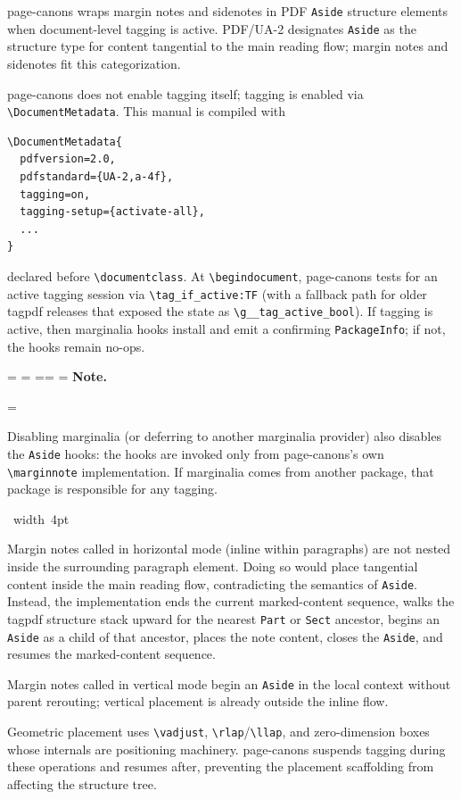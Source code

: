 \documentclass[11pt, twoside, openany]{book}
\makeatletter
\newcommand{\pkg}[1]{\textsf{#1}}
\newcommand{\cmd}[1]{\texttt{\textbackslash #1}}
\newcommand*{\cns@tag@artifact@begin}{}
\newcommand*{\cns@tag@artifact@end}{}
\newenvironment{TodoNote}[1][]{%
  \par\addvspace{0.5\baselineskip plus 2pt}%
  \setbox\cns@box=\vbox\bgroup
    \hsize=\linewidth
    \advance\hsize -10pt
    \linewidth=\hsize \columnwidth=\hsize
    \parindent=\z@
    \noindent\textbf{\sffamily Note\cns@ifnotempty{#1}{ \textmd{(#1)}}.}%
    \par\nobreak
    \@afterindentfalse\@afterheading
    \leftskip=\cns@indent\relax
    \ignorespaces
}{%
  \par
  \egroup
  \vbox{\hbox{%
    \cns@tag@artifact@begin\vrule width 4pt\cns@tag@artifact@end
    \hskip 6pt\relax
    \box\cns@box
  }}%
  \par\addvspace{0.5\baselineskip plus 2pt}%
}
\makeatother
\begin{document}
\pkg{page-canons} wraps margin notes and sidenotes in PDF \texttt{Aside} structure elements when document-level tagging is active. PDF/UA-2 designates \texttt{Aside} as the structure type for content tangential to the main reading flow; margin notes and sidenotes fit this categorization.

\pkg{page-canons} does not enable tagging itself; tagging is enabled via \cmd{DocumentMetadata}. This manual is compiled with

\begin{verbatim}
\DocumentMetadata{
  pdfversion=2.0,
  pdfstandard={UA-2,a-4f},
  tagging=on,
  tagging-setup={activate-all},
  ...
}
\end{verbatim}

declared before \cmd{documentclass}. At \cmd{begin{document}}, \pkg{page-canons} tests for an active tagging session via \cmd{tag\_if\_active:TF} (with a fallback path for older \pkg{tagpdf} releases that exposed the state as \cmd{g\_\_tag\_active\_bool}). If tagging is active, then marginalia hooks install and emit a confirming \texttt{PackageInfo}; if not, the hooks remain no-ops.

\begin{TodoNote}
    Disabling marginalia (or deferring to another marginalia provider) also disables the \texttt{Aside} hooks: the hooks are invoked only from \pkg{page-canons}'s own \cmd{marginnote} implementation. If marginalia comes from another package, that package is responsible for any tagging.
\end{TodoNote}

Margin notes called in horizontal mode (inline within paragraphs) are not nested inside the surrounding paragraph element. Doing so would place tangential content inside the main reading flow, contradicting the semantics of \texttt{Aside}. Instead, the implementation ends the current marked-content sequence, walks the \pkg{tagpdf} structure stack upward for the nearest \texttt{Part} or \texttt{Sect} ancestor, begins an \texttt{Aside} as a child of that ancestor, places the note content, closes the \texttt{Aside}, and resumes the marked-content sequence.

Margin notes called in vertical mode begin an \texttt{Aside} in the local context without parent rerouting; vertical placement is already outside the inline flow.

Geometric placement uses \cmd{vadjust}, \cmd{rlap}/\cmd{llap}, and zero-dimension boxes whose internals are positioning machinery. \pkg{page-canons} suspends tagging during these operations and resumes after, preventing the placement scaffolding from affecting the structure tree.
\end{document}
